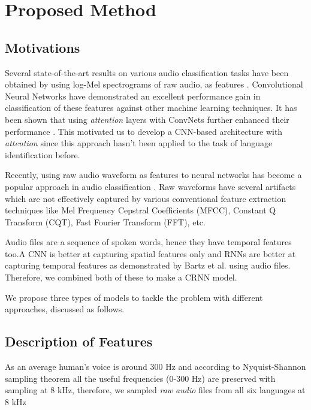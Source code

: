\documentclass[runningheads]{llncs}
\begin{document}
\section{Proposed Method}

\subsection{Motivations}

Several state-of-the-art results on various audio classification tasks have been obtained by using log-Mel spectrograms of raw audio, as features \cite{xu2019general}. Convolutional Neural Networks have demonstrated an excellent performance gain in classification of these features \cite{xu2017unsupervised,hershey2017cnn} against other machine learning techniques. It has been shown that using \emph{attention} layers with ConvNets further enhanced their performance \cite{lee2017raw}. This motivated us to develop a CNN-based architecture with \emph{attention} since this approach hasn’t been applied to the task of language identification before.

Recently, using raw audio waveform as features to neural networks has become a popular approach in audio classification \cite{weireport,lee2017raw}. Raw waveforms have several artifacts which are not effectively captured by various conventional feature extraction techniques like Mel Frequency Cepstral Coefficients (MFCC), Constant Q Transform (CQT), Fast Fourier Transform (FFT), etc.

Audio files are a sequence of spoken words, hence they have temporal features too.A CNN is better at capturing spatial features only and RNNs are better at capturing temporal features as demonstrated by Bartz et al. \cite{bartz2017language} using audio files. Therefore, we combined both of these to make a CRNN model.

We propose three types of models to tackle the problem with different approaches, discussed as follows. 

\subsection{Description of Features}

As an average human's voice is around 300 Hz and according to Nyquist-Shannon sampling theorem all the useful frequencies (0-300 Hz) are preserved with sampling at 8 kHz, therefore, we sampled \emph{raw audio} files from all six languages at 8 kHz
\end{document}
